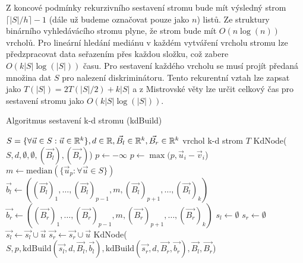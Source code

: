 Z koncové podmínky rekurzivního sestavení stromu bude mít výsledný strom $\lceil |S| / h \rceil - 1$ (dále už budeme označovat pouze jako $n$) listů. Ze struktury binárního vyhledávácího stromu plyne, že strom bude mít $O(n\log(n))$ vrcholů. Pro lineární hledání mediánu v každém vytváření vrcholu stromu lze předzpracovat data seřazením přes každou složku, což zabere $O(k|S|\log(|S|))$ času. Pro sestavení každého vrcholu se musí projít předaná množina dat $S$ pro nalezení diskriminátoru. Tento rekurentní vztah lze zapsat jako $T(|S|) = 2T(|S|/2) + k|S|$ a z Mistrovské věty lze určit celkový čas pro sestavení stromu jako $O(k|S|\log(|S|))$.

\begin{algorithm}[h!]
  \caption{Algoritmus sestavení k-d stromu (kdBuild)}
  \label{algo:kd-tree-build}
  \begin{algorithmic}
    \REQUIRE $S = \{\forall \vec{u} \in S: \vec{u} \in \mathbb{R}^k\}, d \in \mathbb{R}, \vec{B_l} \in \mathbb{R}^k, \vec{B_r} \in \mathbb{R}^k$
    \ENSURE vrchol k-d strom $T$
      \RETURN KdNode($S, d, \emptyset, \emptyset, (\vec{B_l}), (\vec{B_r})$)
    \ENDIF
    \STATE $p \leftarrow -\infty$
        \STATE $p \leftarrow \max(p, \vec{u}_i - \vec{v}_i$)
      \ENDFOR
    \ENDFOR
    \STATE $m \leftarrow \textrm{median}(\{\vec{u}_p: \forall \vec{u} \in S\})$ 
    \STATE $\vec{b_l} \leftarrow ((\vec{B_l})_1, \ldots, (\vec{B_l})_{p-1}, m, (\vec{B_l})_{p+1}, \ldots, (\vec{B_l})_k)$
    \STATE $\vec{b_r} \leftarrow ((\vec{B_r})_1, \ldots, (\vec{B_r})_{p-1}, m, (\vec{B_r})_{p+1}, \ldots, (\vec{B_r})_k)$
    \STATE $s_l \leftarrow \emptyset$
    \STATE $s_r \leftarrow \emptyset$
        \STATE $\vec{s_l} \leftarrow \vec{s_l} \cup \vec{u}$
      \ELSE
        \STATE $\vec{s_r} \leftarrow \vec{s_r} \cup \vec{u}$
      \ENDIF
    \ENDFOR
    \RETURN KdNode($S, p, \textrm{kdBuild}(\vec{s_l}, d, \vec{B_l}, \vec{b_l}), \textrm{kdBuild}(\vec{s_r}, d, \vec{B_r}, \vec{b_r}), \vec{B_l}, \vec{B_r}$)
  \end{algorithmic}

\end{algorithm}

